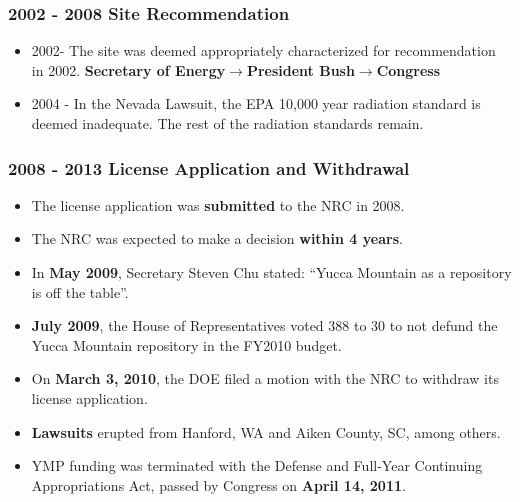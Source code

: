 \begin{frame}
    \frametitle{2002 - 2008 Site Recommendation}
    \begin{itemize}
      \item 2002- The site was deemed appropriately characterized for recommendation in 2002.  \textbf{Secretary of Energy}$\longrightarrow$\textbf{President 
      Bush}$\longrightarrow$\textbf{Congress}
     \item 2004 - In the Nevada Lawsuit, the EPA 10,000 year radiation standard 
       is deemed inadequate. The rest of the radiation standards remain. 
   \end{itemize}
  \end{frame}

\begin{frame}
    \frametitle{2008 - 2013 License Application and Withdrawal}
    \begin{itemize}
      \item The license application was \textbf{submitted} to the NRC in 2008.
      \item The NRC was expected to make a decision \textbf{within 4 years}.
      \item In \textbf{May 2009}, Secretary Steven Chu stated: ``Yucca Mountain as a 
        repository is off the table''.
      \item \textbf{July 2009}, the House of Representatives voted 388 to 30 to 
        not defund the Yucca Mountain repository in the FY2010 budget.
      \item On \textbf{March 3, 2010}, the DOE filed a motion with the NRC to 
        withdraw its license application. 
      \item \textbf{Lawsuits} erupted from Hanford, WA and Aiken County, SC, among 
        others.
      \item YMP funding was terminated with the Defense and Full-Year Continuing 
        Appropriations Act, passed by Congress on \textbf{April 14, 2011}.
    \end{itemize}
  \end{frame}



